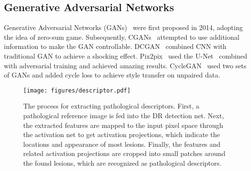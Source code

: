 \documentclass[letterpaper]{article} %
\begin{document}
   
	\subsection{Generative Adversarial Networks}
Generative Adversarial Networks (GANs)~\cite{goodfellow2014generative} were first proposed in 2014, adopting the idea of zero-sum game. Subsequently, CGANs~\cite{mirza2014conditional} attempted to use additional information to make the GAN controllable. DCGAN~\cite{radford2015unsupervised} combined CNN with traditional GAN to achieve a shocking effect. Pix2pix~\cite{isola2017image} used the U-Net~\cite{ronneberger2015u} combined with adversarial training and achieved amazing results. CycleGAN~\cite{zhu2017unpaired} used two sets of GANs and added cycle loss to achieve style transfer on unpaired data.


    		\begin{figure*}[h!]
		\begin{center}
			\texttt{[image: figures/descriptor.pdf]}
		\end{center}
		\caption{The process for extracting pathological descriptors. First, a pathological reference image is fed into the DR detection net. Next, the extracted features are mapped to the input pixel space through the activation net to get activation projections, which indicate the locations and appearance of most lesions. Finally, the features and related activation projections are cropped into small patches around the found lesions, which are recognized as pathological descriptors. }
		\label{fig:descriptor}
	\end{figure*}
    
  
	
\end{document}
